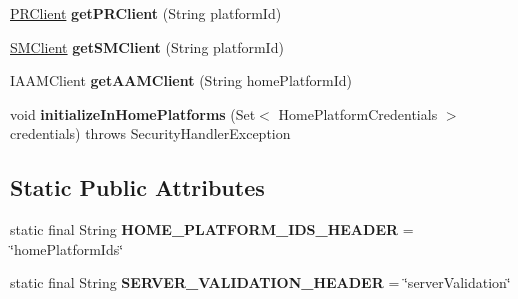 \begin{DoxyCompactItemize}
\hyperlink{interfaceeu_1_1h2020_1_1symbiote_1_1client_1_1interfaces_1_1PRClient}{P\+R\+Client} {\bfseries get\+P\+R\+Client} (String platform\+Id)
\item 
\mbox{\label{classeu_1_1h2020_1_1symbiote_1_1client_1_1feign_1_1SymbIoTeFeignClientFactory_a36978a0ba8716511cd81c652f9a9d6f4}} 
\hyperlink{interfaceeu_1_1h2020_1_1symbiote_1_1client_1_1interfaces_1_1SMClient}{S\+M\+Client} {\bfseries get\+S\+M\+Client} (String platform\+Id)
\item 
\mbox{\label{classeu_1_1h2020_1_1symbiote_1_1client_1_1feign_1_1SymbIoTeFeignClientFactory_a1e34c4b8bda21d74a909a5d8c47f786c}} 
I\+A\+A\+M\+Client {\bfseries get\+A\+A\+M\+Client} (String home\+Platform\+Id)
\item 
\mbox{\label{classeu_1_1h2020_1_1symbiote_1_1client_1_1feign_1_1SymbIoTeFeignClientFactory_a28877266c91f381f37e756b4f628a2dc}} 
void {\bfseries initialize\+In\+Home\+Platforms} (Set$<$ Home\+Platform\+Credentials $>$ credentials)  throws Security\+Handler\+Exception 
\end{DoxyCompactItemize}
\subsection*{Static Public Attributes}
\begin{DoxyCompactItemize}
\item 
\mbox{\label{classeu_1_1h2020_1_1symbiote_1_1client_1_1feign_1_1SymbIoTeFeignClientFactory_a72c435c828043465ff1dcec284af64bf}} 
static final String {\bfseries H\+O\+M\+E\+\_\+\+P\+L\+A\+T\+F\+O\+R\+M\+\_\+\+I\+D\+S\+\_\+\+H\+E\+A\+D\+ER} = \char`\"{}home\+Platform\+Ids\char`\"{}
\item 
\mbox{\label{classeu_1_1h2020_1_1symbiote_1_1client_1_1feign_1_1SymbIoTeFeignClientFactory_ad134ef1ff85b891fe96a3d5600cfc19b}} 
static final String {\bfseries S\+E\+R\+V\+E\+R\+\_\+\+V\+A\+L\+I\+D\+A\+T\+I\+O\+N\+\_\+\+H\+E\+A\+D\+ER} = \char`\"{}server\+Validation\char`\"{}
\end{DoxyCompactItemize}

